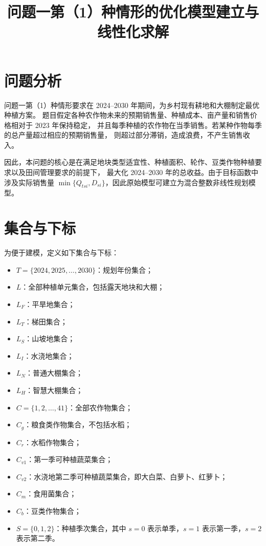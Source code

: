 \documentclass[12pt,a4paper]{ctexart}
\title{问题一第（1）种情形的优化模型建立与线性化求解}
\author{}
\date{}
\begin{document}
\maketitle

\section{问题分析}

问题一第（1）种情形要求在 2024--2030 年期间，为乡村现有耕地和大棚制定最优种植方案。
题目假定各种农作物未来的预期销售量、种植成本、亩产量和销售价格相对于 2023 年保持稳定，
并且每季种植的农作物在当季销售。若某种作物每季的总产量超过相应的预期销售量，
则超过部分滞销，造成浪费，不产生销售收入。

因此，本问题的核心是在满足地块类型适宜性、种植面积、轮作、豆类作物种植要求以及田间管理要求的前提下，
最大化 2024--2030 年的总收益。由于目标函数中涉及实际销售量
$\min\{Q_{tsi},D_{si}\}$，因此原始模型可建立为混合整数非线性规划模型。

\section{集合与下标}

为便于建模，定义如下集合与下标：

\begin{itemize}[leftmargin=2em]
    \item $T=\{2024,2025,\ldots,2030\}$：规划年份集合；
    \item $L$：全部种植单元集合，包括露天地块和大棚；
    \item $L_F$：平旱地集合；
    \item $L_T$：梯田集合；
    \item $L_S$：山坡地集合；
    \item $L_I$：水浇地集合；
    \item $L_N$：普通大棚集合；
    \item $L_H$：智慧大棚集合；
    \item $C=\{1,2,\ldots,41\}$：全部农作物集合；
    \item $C_g$：粮食类作物集合，不包括水稻；
    \item $C_r$：水稻作物集合；
    \item $C_{v1}$：第一季可种植蔬菜集合；
    \item $C_{v2}$：水浇地第二季可种植蔬菜集合，即大白菜、白萝卜、红萝卜；
    \item $C_m$：食用菌集合；
    \item $C_b$：豆类作物集合；
    \item $S=\{0,1,2\}$：种植季次集合，其中 $s=0$ 表示单季，$s=1$ 表示第一季，$s=2$ 表示第二季。
\end{itemize}
\end{document}
